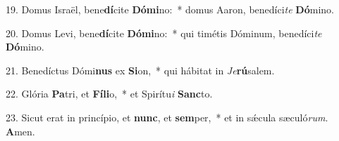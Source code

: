 19. Domus Israël, bene\textbf{dí}cite \textbf{Dó}\textbf{mi}no:~*  domus Aaron, benedíci\textit{te} \textbf{Dó}mino.\

20. Domus Levi, bene\textbf{dí}cite \textbf{Dó}\textbf{mi}no:~*  qui timétis Dóminum, benedíci\textit{te} \textbf{Dó}mino.\

21. Benedíctus Dómi\textbf{nus} ex \textbf{Si}on,~*  qui hábitat in \textit{Je}\textbf{rú}salem.\

22. Glória \textbf{Pa}tri, et \textbf{Fí}\textbf{li}o,~*  et Spirítu\textit{i} \textbf{Sanc}to.\

23. Sicut erat in princípio, et \textbf{nunc}, et \textbf{sem}per,~*  et in sǽcula sæculó\textit{rum}. \textbf{A}men.\

